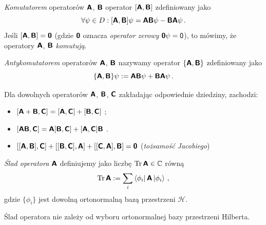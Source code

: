 \documentclass{myclass}
\begin{document}
\begin{definition}
\textit{Komutatorem} operatorów \(\boldsymbol{\mathsf{A}}\), \(\boldsymbol{\mathsf{B}}\) operator \([\boldsymbol{\mathsf{A}},\boldsymbol{\mathsf{B}}]\)
zdefiniowany jako
\begin{equation*}
\forall \psi \in D : [\boldsymbol{\mathsf{A}},\boldsymbol{\mathsf{B}}]\psi = \boldsymbol{\mathsf{A}}\boldsymbol{\mathsf{B}}\psi - \boldsymbol{\mathsf{B}}\boldsymbol{\mathsf{A}}\psi\,. 
\end{equation*}
Jeśli \([\boldsymbol{\mathsf{A}},\boldsymbol{\mathsf{B}}] = \boldsymbol{\mathsf{\mathsf{0}}}\) (gdzie \(\boldsymbol{\mathsf{\mathsf{0}}}\) oznacza
\textit{operator zerowy} \(\boldsymbol{\mathsf{\mathsf{0}}}\psi=\mathsf{0}\)), to mówimy, że operatory
\(\boldsymbol{\mathsf{A}}\), \(\boldsymbol{\mathsf{B}}\) \textit{komutują}.
\end{definition}

\begin{definition}
\textit{Antykomutatorem} operatorów \(\boldsymbol{\mathsf{A}}\), \(\boldsymbol{\mathsf{B}}\) nazywamy operator
\(\{\boldsymbol{\mathsf{A}},\boldsymbol{\mathsf{B}}\}\) zdefiniowany jako
\begin{equation*}
    \{\boldsymbol{\mathsf{A}},\boldsymbol{\mathsf{B}}\}\psi := \boldsymbol{\mathsf{A}}\boldsymbol{\mathsf{B}}\psi + \boldsymbol{\mathsf{B}}\boldsymbol{\mathsf{A}}\psi\,.
\end{equation*}
\end{definition}

\begin{theorem}
Dla dowolnych operatorów \(\boldsymbol{\mathsf{A}}\), \(\boldsymbol{\mathsf{B}}\), \(\boldsymbol{\mathsf{C}}\) zakładając odpowiednie dziedziny,
zachodzi:
\begin{itemize}
    \item \([\boldsymbol{\mathsf{A}} + \boldsymbol{\mathsf{B}},\boldsymbol{\mathsf{C}}] = [\boldsymbol{\mathsf{A}},\boldsymbol{\mathsf{C}}] + [\boldsymbol{\mathsf{B}},\boldsymbol{\mathsf{C}}]\) ;
    \item \([\boldsymbol{\mathsf{A}}\boldsymbol{\mathsf{B}},\boldsymbol{\mathsf{C}}] = \boldsymbol{\mathsf{A}}[\boldsymbol{\mathsf{B}},\boldsymbol{\mathsf{C}}] +
    [\boldsymbol{\mathsf{A}},\boldsymbol{\mathsf{C}}]\boldsymbol{\mathsf{B}}\) .
    \item \([[\boldsymbol{\mathsf{A}}, \boldsymbol{\mathsf{B}}], \boldsymbol{\mathsf{C}}] + [[\boldsymbol{\mathsf{B}},\boldsymbol{\mathsf{C}}],\boldsymbol{\mathsf{A}}] + [[\boldsymbol{\mathsf{C}},
    \boldsymbol{\mathsf{A}}], \boldsymbol{\mathsf{B}}] = \boldsymbol{\mathsf{0}}\) (\textit{tożsamość Jacobiego})
\end{itemize}   
\end{theorem}

\begin{definition}
\textit{Ślad operatora \(\boldsymbol{\mathsf{A}}\)} definiujemy jako liczbę \(\Trace \oper{A} \in \mathbb{C}\)
równą
\begin{equation*}
\Trace{\oper{A}} := \sum_{i} \bra{\phi_i}\oper{A}\ket{\phi_i}\,,
\end{equation*}
gdzie \(\{\phi_i\}\) jest dowolną ortonormalną bazą przestrzeni \(\mathscr{H}\).
\end{definition}

\begin{theorem}
Ślad operatora nie zależy od wyboru ortonormalnej bazy przestrzeni Hilberta.    
\end{theorem}
\end{document}
